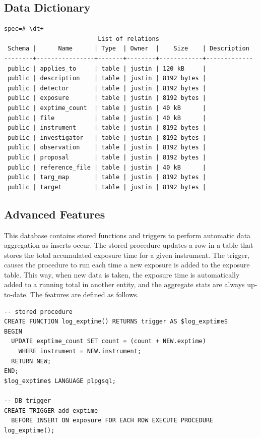 \documentclass[a4paper,11pt]{article}
\begin{document}
\subsection{Data Dictionary}
\begin{verbatim}
spec=# \dt+
                          List of relations
 Schema |      Name      | Type  | Owner  |    Size    | Description 
--------+----------------+-------+--------+------------+-------------
 public | applies_to     | table | justin | 120 kB     | 
 public | description    | table | justin | 8192 bytes | 
 public | detector       | table | justin | 8192 bytes | 
 public | exposure       | table | justin | 8192 bytes | 
 public | exptime_count  | table | justin | 40 kB      | 
 public | file           | table | justin | 40 kB      | 
 public | instrument     | table | justin | 8192 bytes | 
 public | investigator   | table | justin | 8192 bytes | 
 public | observation    | table | justin | 8192 bytes | 
 public | proposal       | table | justin | 8192 bytes | 
 public | reference_file | table | justin | 40 kB      | 
 public | targ_map       | table | justin | 8192 bytes | 
 public | target         | table | justin | 8192 bytes | 

\end{verbatim}

\subsection{Advanced Features}
This database contains stored functions and triggers to perform automatic data aggregation as inserts occur.  The stored procedure updates a row in a table that stores the total accumulated exposure time for a given instrument.  The trigger, causes the procedure to run each time a new exposure is added to the exposure table.  This way, when new data is taken, the exposure time is automatically added to a running total in another entity, and the aggregate stats are always up-to-date.  The features are defined as follows.

\begin{verbatim}
-- stored procedure
CREATE FUNCTION log_exptime() RETURNS trigger AS $log_exptime$
BEGIN
  UPDATE exptime_count SET count = (count + NEW.exptime)
    WHERE instrument = NEW.instrument;
  RETURN NEW;
END;
$log_exptime$ LANGUAGE plpgsql;
  
-- DB trigger
CREATE TRIGGER add_exptime
  BEFORE INSERT ON exposure FOR EACH ROW EXECUTE PROCEDURE log_exptime();
\end{verbatim}
\end{document}
